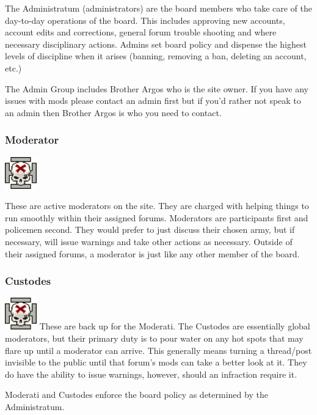 \documentclass[12pt]{article}
\begin{document}
The Administratum (administrators) are the board members who take care 
of the day-to-day operations of the board. This includes approving new 
accounts, account edits and corrections, general forum trouble shooting 
and where necessary disciplinary actions. Admins set board policy and 
dispense the highest levels of discipline when it arises (banning, 
removing a ban, deleting an account, etc.)

The Admin Group includes Brother Argos who is the site owner. If you 
have any issues with mods please contact an admin first but if you'd 
rather not speak to an admin then Brother Argos is who you need to 
contact.

\subsubsection{Moderator}
\includegraphics[width=39pt, height=39pt]{Mod.png}

These are active moderators on the site. They are charged with helping 
things to run smoothly within their assigned forums. Moderators are 
participants first and policemen second. They would prefer to just 
discuss their chosen army, but if necessary, will issue warnings and 
take other actions as necessary. Outside of their assigned forums, a 
moderator is just like any other member of the board.

\subsubsection{Custodes}
\includegraphics[width=39pt, height=39pt]{Mod.png}
These are back up for the Moderati. The Custodes are essentially global 
moderators, but their primary duty is to pour water on any hot spots 
that may flare up until a moderator can arrive. This generally means 
turning a thread/post invisible to the public until that forum's mods 
can take a better look at it. They do have the ability to issue 
warnings, however, should an infraction require it.

Moderati and Custodes enforce the board policy as determined by the 
Administratum.
\end{document}
